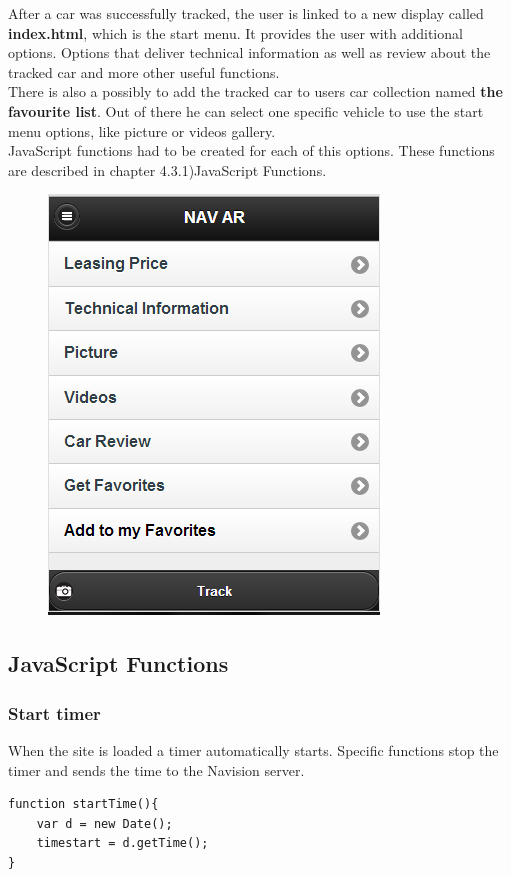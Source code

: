 After a car was successfully tracked, the user is linked to a new display called \textbf{index.html}, which is the start menu. It provides the user with additional options. Options that deliver technical information as well as review about the tracked car and more other useful functions. 
\\

There is also a possibly to add the tracked car to users car collection named \textbf{the favourite list}. Out of there he can select one specific vehicle to use the start menu options, like picture or videos gallery.
\\

JavaScript functions had to be created for each  of this options. These functions are described in chapter 4.3.1)JavaScript Functions.
\\

\begin{figure}[]
\centering
\includegraphics[width=0.5\linewidth]{graphics/chapter4/3}
\caption{}
\label{fig:3}
\end{figure}
\newpage

\subsection{JavaScript Functions}

\subsubsection{Start timer}
When the site is loaded a timer automatically starts. Specific functions stop the timer and sends the time to the Navision server.
\\
\begin{lstlisting}[language=html, caption= 
Start timer function,captionpos=b]
function startTime(){
	var d = new Date();
	timestart = d.getTime();
}
\end{lstlisting}

